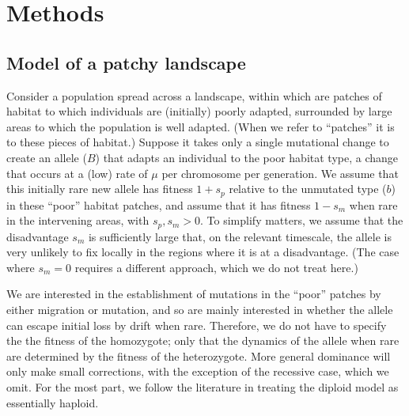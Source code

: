 \documentclass{article}
\begin{document}





\section{Methods}

\subsection{Model of a patchy landscape}
\label{ss:patchyspace}

Consider a population spread across a landscape, 
within which are patches of habitat to which individuals are (initially) poorly adapted,
surrounded by large areas to which the population is well adapted.
(When we refer to ``patches'' it is to these pieces of habitat.)
Suppose it takes only a single mutational change to create an allele ($B$) that adapts an individual to the poor habitat type, 
a change that occurs at a (low) rate of $\mu$ per chromosome per generation. 
We assume that this initially rare new
allele has fitness $1+s_p$ relative to the unmutated type ($b$) in these ``poor'' habitat patches,
and assume that it has fitness $1-s_m$ when rare in the intervening areas, with $s_p, s_m > 0$.
To simplify matters, we assume that the disadvantage $s_m$ 
is sufficiently large that, on the relevant timescale,
the allele is very unlikely to fix locally in the regions where it is at a disadvantage.
(The case where $s_m=0$ requires a different approach, which we do not treat here.)

We are interested in the establishment of mutations in the ``poor'' patches by either
migration or mutation, and so are mainly interested in whether the allele
can escape initial loss by drift when rare. 
Therefore, we do not have to specify the the fitness of the homozygote; 
only that the dynamics of the allele when rare 
are determined by the fitness of the heterozygote. 
More general dominance will only make small corrections,
with the exception of the recessive case, which we omit.
For the most part, 
we follow the literature in treating the diploid model as essentially haploid.
\end{document}
